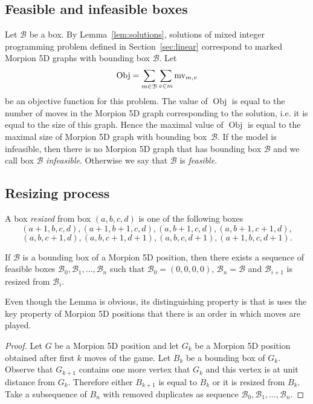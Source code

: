 \subsection{Feasible and infeasible boxes}

Let $\mathcal{B}$ be a box.
By Lemma~\ref{lem:solutions}, solutions of mixed integer programming problem
  defined in Section~\ref{sec:linear} correspond to marked Morpion 5D graphs with bounding
  box $\mathcal{B}$.
Let
  \[
    \operatorname{Obj} = \sum_{m \in \mathcal{B}} \sum_{v \in m} \operatorname{mv}_{m, v}
  \]
be an objective function for this problem. The value of $\operatorname{Obj}$ is equal to the number
 of moves in the   Morpion 5D graph corresponding to the solution, i.e. it is equal to the size of this graph.
Hence the maximal value of $\operatorname{Obj}$ is equal to the maximal size of Morpion 5D graph with bounding box~$\mathcal{B}$.
If the model is infeasible, then there is no Morpion 5D graph that has bounding box $\mathcal{B}$ and we call box $\mathcal{B}$ \emph{infeasible}. Otherwise we say that $\mathcal{B}$ is \emph{feasible}.

\subsection{Resizing process}

\begin{definition} A box \emph{resized} from box $(a, b, c, d)$ is one of the following boxes
\[
  (a + 1, b, c, d), (a + 1, b +1 , c, d),  (a, b + 1, c, d), 
(a, b + 1, c + 1, d), 
\]
\[
(a, b, c + 1, d), (a, b, c + 1, d + 1),
(a, b, c, d + 1), (a + 1, b, c, d + 1).     
\]
\end{definition}

\begin{lemma}\label{lem:resizing}
If $\mathcal{B}$ is a bounding box of a Morpion 5D position, then there exists a sequence of
  feasible
  boxes $\mathcal{B}_0, \mathcal{B}_1, \ldots, \mathcal{B}_n$ such that
  $\mathcal{B}_0 = (0,0,0,0)$, $\mathcal{B}_n = \mathcal{B}$ and 
  $\mathcal{B}_{i+1}$ is resized from $\mathcal{B}_{i}$.
\end{lemma}

Even though the Lemma is obvious, its distinguishing property is that
  is uses the key property of Morpion 5D positions that there is an order in which moves are played.
  
\begin{proof}
Let $G$ be a Morpion 5D position and let $G_k$ be a Morpion 5D position
  obtained after first $k$ moves of the game.
Let $B_k$ be a bounding box of $G_k$.
Observe that $G_{k+1}$ contains one more vertex that $G_{k}$ and this vertex is at unit distance
  from $G_{k}$.
Therefore either $B_{k+1}$ is equal to $B_k$ or it is resized from $B_k$.
Take a subsequence of $B_n$ with removed duplicates as sequence $\mathcal{B}_0, \mathcal{B}_1, \ldots, \mathcal{B}_n$.
\end{proof}

